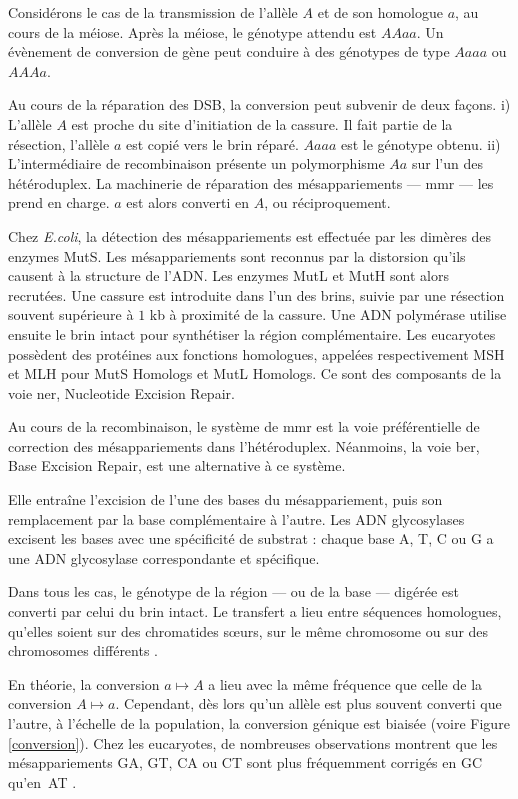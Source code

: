 \documentclass[11pt, oneside]{scrartcl}
\begin{document}
Considérons le cas de la transmission de l'allèle \(A\) et de son homologue \(a\),
au cours de la méiose. Après la méiose, le génotype attendu est \(AAaa\). Un
évènement de conversion de gène peut conduire à des génotypes de type \(Aaaa\) ou
\(AAAa\).

Au cours de la réparation des DSB, la conversion peut subvenir de deux façons.
i) L'allèle \(A\) est proche du site d'initiation de la cassure. Il fait partie de
la résection, l'allèle \(a\) est copié vers le brin réparé. \(Aaaa\) est le génotype
obtenu. ii) L'intermédiaire de recombinaison présente un polymorphisme \(Aa\) sur
l'un des hétéroduplex. La machinerie de réparation des mésappariements ---
\ac{mmr} --- les prend en charge. \(a\) est alors converti en \(A\), ou
réciproquement.

Chez \emph{E.coli}, la détection des mésappariements est effectuée par les dimères
des enzymes MutS. Les mésappariements sont reconnus par la distorsion qu'ils
causent à la structure de l'ADN. Les enzymes MutL et MutH sont alors recrutées.
Une cassure est introduite dans l'un des brins, suivie par une résection souvent
supérieure à \(1\) kb à proximité de la cassure. Une ADN polymérase utilise
ensuite le brin intact pour synthétiser la région complémentaire. Les eucaryotes
possèdent des protéines aux fonctions homologues, appelées respectivement MSH et
MLH pour MutS Homologs et MutL Homologs. Ce sont des composants de la voie
\ac{ner}, Nucleotide Excision Repair.

Au cours de la recombinaison, le système de \ac{mmr} est la voie préférentielle
de correction des mésappariements dans l'hétéroduplex. Néanmoins, la voie
\ac{ber}, Base Excision Repair, est une alternative à ce système.

Elle entraîne l'excision de l'une des bases du mésappariement, puis son
remplacement par la base complémentaire à l'autre. Les ADN glycosylases excisent
les bases avec une spécificité de substrat : chaque base A, T, C ou G a une ADN
glycosylase correspondante et spécifique.

Dans tous les cas, le génotype de la région --- ou de la base --- digérée est
converti par celui du brin intact. Le transfert a lieu entre séquences
homologues, qu'elles soient sur des chromatides sœurs, sur le même chromosome ou
sur des chromosomes différents \cite{chen_gene_2007}.

\begin{transition}
  En théorie, la conversion $a \mapsto A$ a lieu avec la même fréquence que
  celle de la conversion $A \mapsto a$. Cependant, dès lors qu'un allèle est
  plus souvent converti que l'autre, à l'échelle de la population, la conversion
  génique est biaisée (voire Figure \ref{conversion}). Chez les eucaryotes, de
  nombreuses observations montrent que les mésappariements GA, GT, CA ou CT sont
  plus fréquemment corrigés en GC qu'en AT \cite{duret_biased_2009}.
\end{transition}
\end{document}
